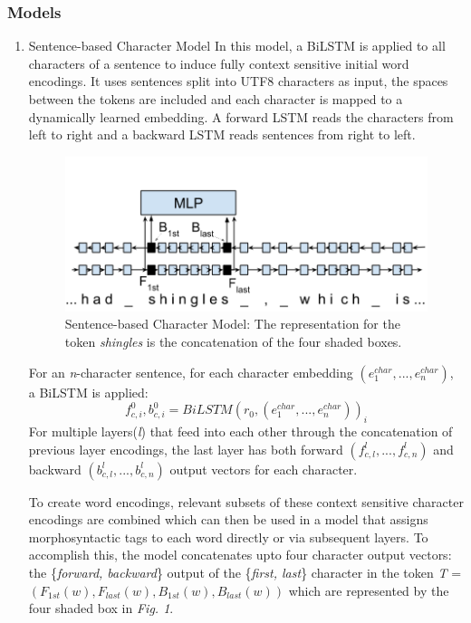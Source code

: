 \documentclass[11pt]{article}
\begin{document}
\subsubsection{Models}
\label{sec:org8c9b355}
\begin{enumerate}
\item Sentence-based Character Model
\label{sec:org7c75adf}
In this model, a BiLSTM is applied to all characters of a sentence to induce fully context sensitive initial word encodings. It uses sentences split into UTF8 characters as input, the spaces between the tokens are included and each character is mapped to a dynamically learned embedding. A forward LSTM reads the characters from left to right and a backward LSTM reads sentences from right to left.

\begin{figure}[htbp]
\centering
\includegraphics[width=.9\linewidth]{assets/nnfl1a.png}
\caption{Sentence-based Character Model: The representation for the token \emph{shingles} is the concatenation of the four shaded boxes.}
\end{figure}

For an \emph{n}-character sentence, for each character embedding \((e_{1}^{char},...,e_{n}^{char})\), a BiLSTM is applied:
\[
f_{c,i}^{0},b_{c,i}^{0} = BiLSTM(r_{0},(e_{1}^{char},...,e_{n}^{char}))_{i}
\]
For multiple layers(\emph{l}) that feed into each other through the concatenation of previous layer encodings, the last layer has both forward \((f_{c,l}^{l},...,f_{c,n}^{l})\) and backward \((b_{c,l}^{l},...,b_{c,n}^{l})\) output vectors for each character.

To create word encodings, relevant subsets of these context sensitive character encodings are combined which can then be used in a model that assigns morphosyntactic tags to each word directly or via subsequent layers. To accomplish this, the model concatenates upto four character output vectors: the \{\emph{forward, backward}\} output of the \{\emph{first, last}\} character in the token \emph{T} = \((F_{1st}(w), F_{last}(w), B_{1st}(w), B_{last}(w))\) which are represented by the four shaded box in \emph{Fig. 1}.


\end{enumerate}
\end{document}
